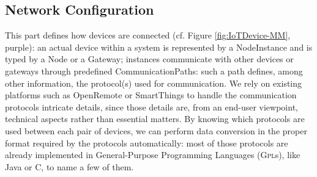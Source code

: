 	
\subsection{Network Configuration}
\label{sec:IoTDSL-NetworkConfiguration}

This part defines how devices are connected (cf. Figure \ref{fig:IoTDevice-MM}, purple): an actual device within a system is represented by a \textsf{NodeInstance} and is typed by a \textsf{Node} or a \textsf{Gateway}; instances communicate with other \IOT devices or gateways through predefined \textsf{CommunicationPath}s: such a path defines, among other information, the protocol(s) used for communication. We rely on existing platforms such as OpenRemote or SmartThings to handle the communication protocols intricate details, since those details are, from an end-user viewpoint, technical aspects rather than essential matters. By knowing which protocols are used between each pair of devices, we can perform data conversion in the proper format required by the protocols automatically: most of those protocols are already implemented in General-Purpose Programming Languages (\textsc{Gpl}s), like Java or C, to name a few of them.
	
